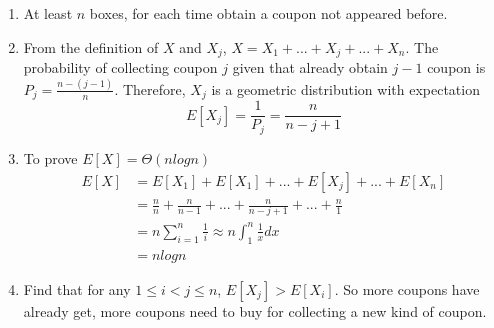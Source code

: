 \documentclass{assignment}
\begin{document}
	            \begin{homeworkProblem}
	            \begin{enumerate}

	            \item At least $n$ boxes, for each time obtain a coupon not appeared before. 
	            \item From the definition of $X$ and $X_j$, $X = X_1 + ... + X_j + ... + X_n$. The probability of collecting coupon $j$ given that already obtain $j-1$ coupon  is $P_j =\displaystyle \frac{n-(j-1)}{n}$. Therefore, $X_j$ is a geometric distribution with expectation $$E[X_j] =\frac{1}{P_j} = \frac{n}{n-j+1} $$
	            \item To prove $E[X]=\Theta (nlogn)$
	            \begin{align*}
E[X] &= E[X_1] + E[X_1] +... + E[X_j] + ... + E[X_n] \\
&= 	\frac{n}{n} + \frac{n}{n-1} +  ...+\frac{n}{n-j+1}+...+\frac{n}{1} \\ 
&= n\sum_{i=1}^n \frac{1}{i} \approx n \int_1^n \frac{1}{x} dx \\
&= nlogn
	            \end{align*}
	            \item Find that for any $1\leq i < j \leq n$, $E[X_j] > E[X_i]$. So more coupons have already get, more coupons need to buy for collecting a new kind of coupon. 
	            \end{enumerate}
	            	        \end{homeworkProblem}
\end{document}
